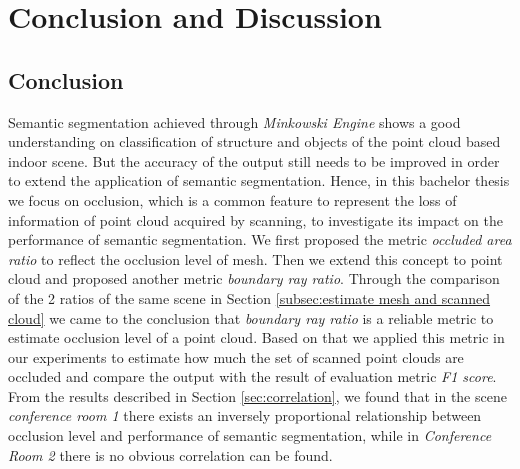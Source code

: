 \documentclass[11pt, a4paper,oneside,chapterprefix=false]{scrbook}
\begin{document}
\chapter{Conclusion and Discussion} \label{chp:conclusion}

\section{Conclusion} \label{sec:conclusion}

Semantic segmentation achieved through \emph{Minkowski Engine} shows a good understanding on classification of structure and objects of the point cloud based indoor scene. But the accuracy of the output still needs to be improved in order to extend the application of semantic segmentation. Hence, in this bachelor thesis we focus on occlusion, which is a common feature to represent the loss of information of point cloud acquired by scanning, to investigate its impact on the performance of semantic segmentation. We first proposed the metric \emph{occluded area ratio} to reflect the occlusion level of mesh. Then we extend this concept to point cloud and proposed another metric \emph{boundary ray ratio}. Through the comparison of the 2 ratios of the same scene in Section \ref{subsec:estimate mesh and scanned cloud} we came to the conclusion that \emph{boundary ray ratio} is a reliable metric to estimate occlusion level of a point cloud. Based on that we applied this metric in our experiments to estimate how much the set of scanned point clouds are occluded and compare the output with the result of evaluation metric \emph{F1 score}. From the results described in Section \ref{sec:correlation}, we found that in the scene \emph{conference room 1} there exists an inversely proportional relationship between occlusion level and performance of semantic segmentation, while in \emph{Conference Room 2} there is no obvious correlation can be found. 

\vspace{10pt}
\end{document}
